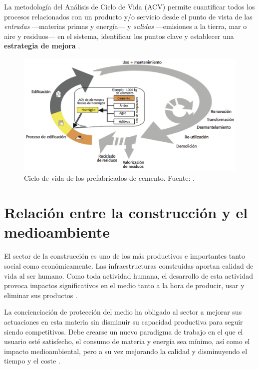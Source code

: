La metodología del Análisis de Ciclo de Vida (ACV) permite cuantificar todos los procesos relacionados con un producto y/o servicio desde el punto de vista de las \textit{entradas} —materias primas y energía— y \textit{salidas} —emisiones a la tierra, mar o aire y residuos— en el sistema, identificar los puntos clave y establecer una \textbf{estrategia de mejora} \cite{iso14040}.

\begin{figure}[!htb]
\centering
\includegraphics[width=12cm]{ciclodevida.png}
\caption[Ciclo de vida de los prefabricados de cemento.]{Ciclo de vida de los prefabricados de cemento. Fuente: \cite{oficemen}.}
\label{fig:ciclodevidaprefabric}
\end{figure}

\section{Relación entre la construcción y el medioambiente}
El sector de la construcción es uno de los más productivos e importantes tanto social como económicamente. Las infraestructuras construidas aportan calidad de vida al ser humano. Como toda actividad humana, el desarrollo de esta actividad provoca impactos significativos en el medio tanto a la hora de producir, usar y eliminar sus productos \cite{carvalho}.

La concienciación de protección del medio ha obligado al sector a mejorar sus actuaciones en esta materia sin disminuir su capacidad productiva para seguir siendo competitivos. Debe crearse un nuevo paradigma de trabajo en el que el usuario esté satisfecho, el consumo de materia y energía sea mínimo, así como el impacto medioambiental, pero a su vez mejorando la calidad y disminuyendo el tiempo y el coste \cite{augenbroe}.

